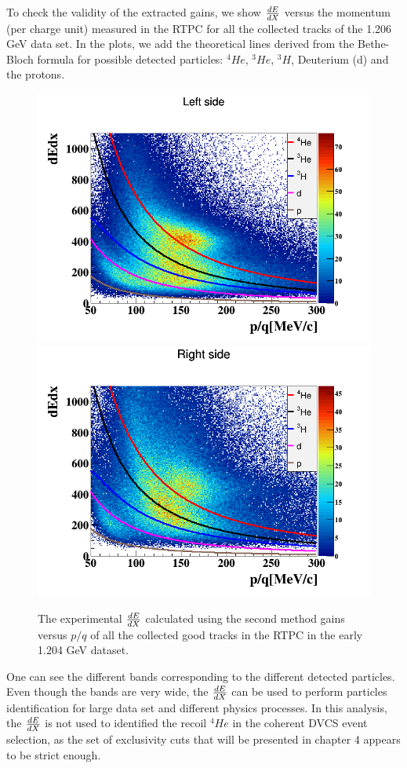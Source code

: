 To check the validity of the extracted gains, we show $\small{\frac{dE}{dX}}$ versus the momentum (per charge unit) measured in the RTPC for all the collected tracks of the 1.206 GeV data set. In the plots, we add the theoretical lines derived from the Bethe-Bloch formula for possible detected particles: $^4He$, $^3He$, $^3H$, Deuterium (d) and the protons.
\begin{figure}[tbp]
\includegraphics[scale=0.35]{fig_rtpc/dedx_p_l.png}
\includegraphics[scale=0.35]{fig_rtpc/dedx_p_r.png}
\caption{The experimental $\small{\frac{dE}{dX}}$ calculated using the second method gains versus $p/q$ of all the collected good tracks in the RTPC in the early 1.204 GeV dataset.}
\label{fig:dedx_all}
\end{figure}
One can see the different bands corresponding to the different detected particles.  
Even though the bands are very wide, the $\small{\frac{dE}{dX}}$ can be used to 
perform particles identification for large data set and different physics 
processes. In this analysis, the $\small{\frac{dE}{dX}}$ is not used to 
identified the recoil $^{4}He$ in the coherent DVCS event selection, as the 
 set of exclusivity cuts that will be 
presented in chapter 4 appears to be strict enough.

